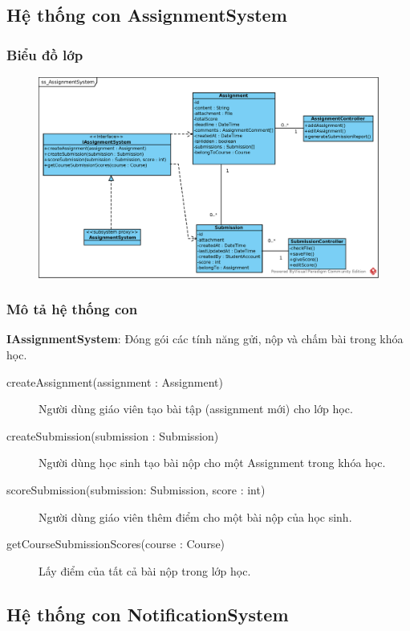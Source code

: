 \documentclass[./../main_file.tex]{subfiles}
\begin{document}
	\subsection{Hệ thống con AssignmentSystem}
		\subsubsection{Biểu đồ lớp}
		\begin{figure}[H]
			\centering
			\includegraphics[width=\linewidth]{./images/ss_AssignmentSystem.eps}
		\end{figure}
		\subsubsection{Mô tả hệ thống con}
		\textbf{IAssignmentSystem}: Đóng gói các tính năng gửi, nộp và chấm bài trong khóa học.
		\begin{description}
			\item[createAssignment(assignment : Assignment)] Người dùng giáo viên tạo bài tập (assignment mới) cho lớp học.
			\item[createSubmission(submission : Submission)] Người dùng học sinh tạo bài nộp cho một Assignment trong khóa học.
			\item[scoreSubmission(submission: Submission, score : int)] Người dùng giáo viên thêm điểm cho một bài nộp của học sinh.
			\item[getCourseSubmissionScores(course : Course)] Lấy điểm của tất cả bài nộp trong lớp học.
		\end{description}
		
	\subsection{Hệ thống con NotificationSystem}
\end{document}
